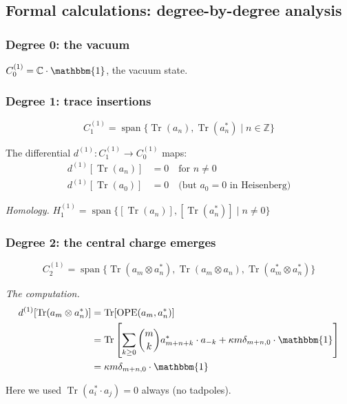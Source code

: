 \subsection{Formal calculations: degree-by-degree analysis}

\subsubsection{Degree 0: the vacuum}

$C_0^{(1)} = \mathbb{C} \cdot \mathbbm{1}$, the vacuum state.

\subsubsection{Degree 1: trace insertions}

\[C_1^{(1)} = \operatorname{span}\{ \operatorname{Tr}(a_n), \operatorname{Tr}(a^*_n) \mid n \in \mathbb{Z} \}\]

The differential $d^{(1)}: C_1^{(1)} \to C_0^{(1)}$ maps:
\begin{align}
d^{(1)}[\operatorname{Tr}(a_n)] &= 0 \quad \text{for } n \neq 0 \\
d^{(1)}[\operatorname{Tr}(a_0)] &= 0 \quad \text{(but $a_0 = 0$ in Heisenberg)}
\end{align}

\emph{Homology.} $H_1^{(1)} = \operatorname{span}\{ [\operatorname{Tr}(a_n)], [\operatorname{Tr}(a^*_n)] \mid n \neq 0 \}$

\subsubsection{Degree 2: the central charge emerges}

\[C_2^{(1)} = \operatorname{span}\{ 
\operatorname{Tr}(a_m \otimes a^*_n), 
\operatorname{Tr}(a_m \otimes a_n), 
\operatorname{Tr}(a^*_m \otimes a^*_n) 
\}\]

\emph{The computation.}
\begin{align}
d^{(1)}[\operatorname{Tr}(a_m \otimes a^*_n)] 
&= \operatorname{Tr}[\text{OPE}(a_m, a^*_n)] \\
&= \operatorname{Tr}\left[ \sum_{k \geq 0} \binom{m}{k} a^*_{m+n+k} \cdot a_{-k} 
+ \kappa m \delta_{m+n,0} \cdot \mathbbm{1} \right] \\
&= \kappa m \delta_{m+n,0} \cdot \mathbbm{1}
\end{align}

Here we used $\operatorname{Tr}(a^*_i \cdot a_j) = 0$ always (no tadpoles).

